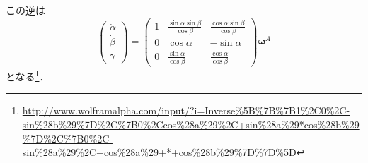 この逆は
\begin{equation}
  \begin{pmatrix}
    \dot{\alpha}\\
    \dot{\beta}\\
    \dot{\gamma}
  \end{pmatrix} =
  \begin{pmatrix}
    1 & \frac{\sin \alpha \sin \beta}{\cos \beta} & \frac{\cos \alpha \sin \beta}{\cos \beta} \\
    0 & \cos \alpha & - \sin \alpha \\
    0 & \frac{\sin \alpha}{\cos \beta} & \frac{\cos \alpha}{\cos \beta}
  \end{pmatrix}
  \boldsymbol{\omega}^{A}
\end{equation}
となる\footnote{\url{http://www.wolframalpha.com/input/?i=Inverse\%5B\%7B\%7B1\%2C0\%2C-sin\%28b\%29\%7D\%2C\%7B0\%2Ccos\%28a\%29\%2C+sin\%28a\%29*cos\%28b\%29\%7D\%2C\%7B0\%2C-sin\%28a\%29\%2C+cos\%28a\%29+*+cos\%28b\%29\%7D\%7D\%5D}}．

